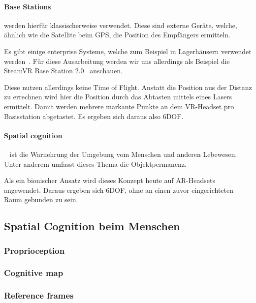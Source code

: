 \paragraph{Base Stations}\label{par:base-stations} werden hierfür klassischerweise verwendet.
Diese sind externe Geräte, welche, ähnlich wie die Satellite beim GPS, die Position des Empfängers ermitteln.

Es gibt einige enterprise Systeme, welche zum Beispiel in Lagerhäusern verwendet werden~\autocite{wikipedia-contributors-2023E}.
Für diese Ausarbeitung werden wir uns allerdings als Beispiel die SteamVR Base Station 2.0~\autocite{valve-corporation-no-date} anschauen.

Diese nutzen allerdings keine Time of Flight.
Anstatt die Position aus der Distanz zu errechnen wird hier die Position durch das Abtasten mittels eines Lasers ermittelt.
Damit werden mehrere markante Punkte an dem VR-Headset pro Basisstation abgetastet.
Es ergeben sich daraus also 6DOF\@.

\paragraph{Spatial cognition}~\autocite{wikipedia-contributors-2023F} ist die Warnehrung der Umgebung vom Menschen und anderen Lebewesen.
Unter anderem umfasst dieses Thema die Objektpermanenz.

Als ein bionischer Ansatz wird dieses Konzept heute auf AR-Headsets angewendet.
Daraus ergeben sich 6DOF, ohne an einen zuvor eingerichteten Raum gebunden zu sein.

\subsection{Spatial Cognition beim Menschen}\label{subsec:spatial-cognition-beim-menschen}
    \subsubsection{Proprioception}\label{subsubsec:proprioception}
    \subsubsection{Cognitive map}\label{subsubsec:cognitive-map}
    \subsubsection{Reference frames}\label{subsubsec:reference-frames}


